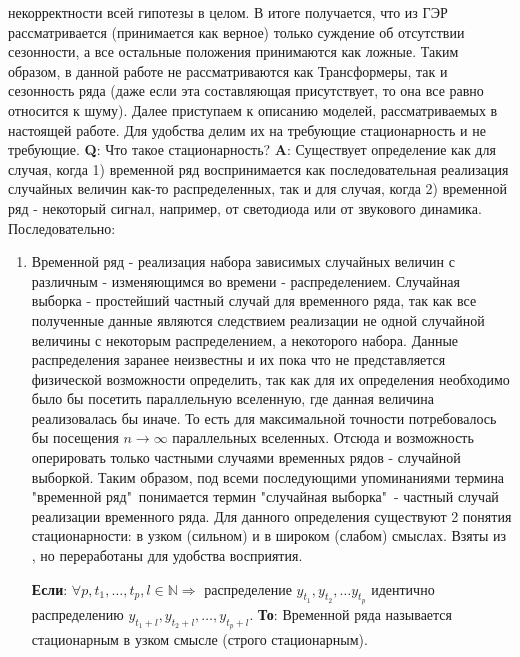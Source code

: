 некорректности всей гипотезы в целом. В итоге получается, что из ГЭР рассматривается (принимается как верное) только суждение об отсутствии сезонности, а все остальные положения принимаются как ложные. Таким образом, в данной работе не рассматриваются как Трансформеры, так и сезонность ряда (даже если эта составляющая присутствует, то она все равно относится к шуму). Далее приступаем к описанию моделей, рассматриваемых в настоящей работе. Для удобства делим их на требующие стационарность и не требующие. \textbf{Q}: Что такое стационарность? \textbf{A}: Существует определение как для случая, когда 1) временной ряд воспринимается как последовательная реализация случайных величин как-то распределенных, так и для случая, когда 2) временной ряд - некоторый сигнал, например, от светодиода или от звукового динамика. Последовательно:
		\begin{enumerate}
			\item Временной ряд - реализация набора зависимых случайных величин с различным - изменяющимся во времени - распределением. Случайная выборка - простейший частный случай для временного ряда, так как все полученные данные являются следствием реализации не одной случайной величины с некоторым распределением, а некоторого набора. Данные распределения заранее неизвестны и их пока что не представляется физической возможности определить, так как для их определения необходимо было бы посетить параллельную вселенную, где данная величина реализовалась бы иначе. То есть для максимальной точности потребовалось бы посещения $n \to \infty$ параллельных вселенных. Отсюда и возможность оперировать только частными случаями временных рядов - случайной выборкой. Таким образом, под всеми последующими упоминаниями термина "временной ряд"\ понимается термин "случайная выборка"\ - частный случай реализации временного ряда. Для данного определения существуют 2 понятия стационарности: в узком (сильном) и в широком (слабом) смыслах. Взяты из \cite{stationarity_of_time_series_econometrics}, но переработаны для удобства восприятия.
			\begin{definition} \label{def::strong_ts_stationarity}
				\textbf{Если}: $\forall p, t_1, \ldots, t_p, l \in \mathbb{N} \Rightarrow$ распределение $y_{t_1}, y_{t_2}, \ldots y_{t_p}$ идентично распределению $y_{t_1 + l}, y_{t_2 + l}, \ldots, y_{t_p + l}$. \textbf{То}: Временной ряда называется стационарным в узком смысле (строго стационарным).
			\end{definition}
			\begin{definition} \label{def::weak_ts_stationarity}

\end{definition}
\end{enumerate}

